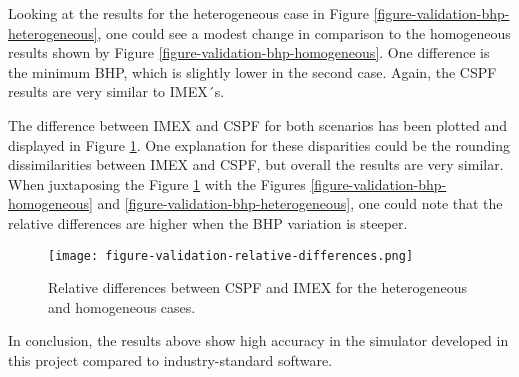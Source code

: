 Looking at the results for the heterogeneous case in Figure \ref{figure-validation-bhp-heterogeneous}, one could see a modest change in comparison to the homogeneous results shown by Figure \ref{figure-validation-bhp-homogeneous}.
%
One difference is the minimum BHP, which is slightly lower in the second case.
%
Again, the CSPF results are very similar to IMEX´s.

The difference between IMEX and CSPF for both scenarios has been plotted and displayed in Figure \ref{figure-validation-relative-differences}.
%
One explanation for these disparities could be the rounding dissimilarities between IMEX and CSPF, but overall the results are very similar.
%
When juxtaposing the Figure \ref{figure-validation-relative-differences} with the Figures \ref{figure-validation-bhp-homogeneous} and \ref{figure-validation-bhp-heterogeneous}, one could note that the relative differences are higher when the BHP variation is steeper.
%
\begin{figure}[H]
	\centering
	\texttt{[image: figure-validation-relative-differences.png]}
	\caption{Relative differences between CSPF and IMEX for the heterogeneous and homogeneous cases.}
	\label{figure-validation-relative-differences}
\end{figure}

In conclusion, the results above show high accuracy in the simulator developed in this project compared to industry-standard software.


